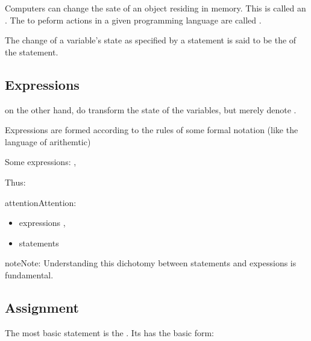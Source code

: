 \documentclass[a4paper,10pt,english]{jupyterBook}
\begin{document}
\sphinxAtStartPar
Computers can change the sate of an object residing in memory. This is called an . The  to peform actions in a given programming language are called .

\sphinxAtStartPar
The change of a variable’s state as specified by a statement is said to be the  of the statement.


\subsection{Expressions}
\label{\detokenize{text/progtut/statements:expressions}}
\sphinxAtStartPar
{} on the other hand,  do  transform the state of the variables, but merely denote .

\sphinxAtStartPar
Expressions are formed according to the rules of some formal notation (like the language of arithemtic)

\sphinxAtStartPar
Some expressions: , 

\sphinxAtStartPar
Thus:

\begin{sphinxadmonition}{attention}{Attention:}\begin{itemize}
\item {} 
\sphinxAtStartPar
expressions ,

\item {} 
\sphinxAtStartPar
statements 

\end{itemize}
\end{sphinxadmonition}

\begin{sphinxadmonition}{note}{Note:}
\sphinxAtStartPar
Understanding this dichotomy between statements and expessions is fundamental.
\end{sphinxadmonition}


\subsection{Assignment}
\label{\detokenize{text/progtut/statements:assignment}}
\sphinxAtStartPar
The most basic statement is the . Its has the basic form:
\end{document}
